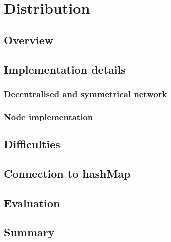
\chapter{Distribution}

\section{Overview}
\section{Implementation details}
\subsection{Decentralised and symmetrical network}
\subsection{Node implementation}
\section{Difficulties}
\section{Connection to hashMap}
\section{Evaluation}
\section{Summary}
